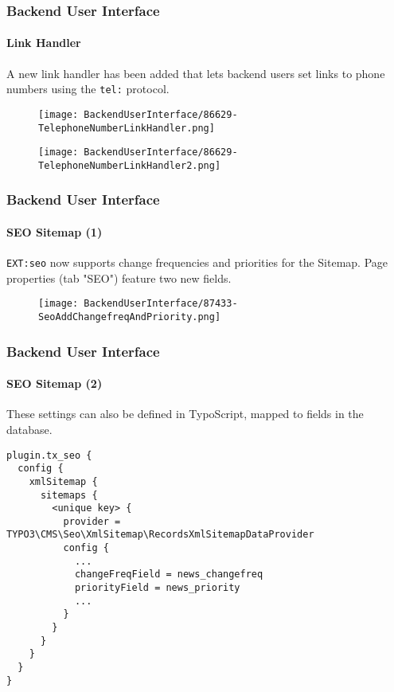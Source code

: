 
\begin{frame}[fragile]
	\frametitle{Backend User Interface}
	\framesubtitle{Link Handler}

	A new link handler has been added that lets backend users set links to phone
    numbers using the \texttt{tel:} protocol.

	\begin{figure}
		\texttt{[image: BackendUserInterface/86629-TelephoneNumberLinkHandler.png]}
	\end{figure}

	\begin{figure}
		\texttt{[image: BackendUserInterface/86629-TelephoneNumberLinkHandler2.png]}
	\end{figure}

\end{frame}


\begin{frame}[fragile]
	\frametitle{Backend User Interface}
	\framesubtitle{SEO Sitemap (1)}

	\texttt{EXT:seo} now supports change frequencies and priorities for the Sitemap.
	Page properties (tab "SEO") feature two new fields.

	\begin{figure}
		\texttt{[image: BackendUserInterface/87433-SeoAddChangefreqAndPriority.png]}
	\end{figure}

\end{frame}


\begin{frame}[fragile]
	\frametitle{Backend User Interface}
	\framesubtitle{SEO Sitemap (2)}

	\lstset{basicstyle=\tiny\ttfamily}

	These settings can also be defined in TypoScript, mapped to fields in the database.

	\begin{lstlisting}
plugin.tx_seo {
  config {
    xmlSitemap {
      sitemaps {
        <unique key> {
          provider = TYPO3\CMS\Seo\XmlSitemap\RecordsXmlSitemapDataProvider
          config {
            ...
            changeFreqField = news_changefreq
            priorityField = news_priority
            ...
          }
        }
      }
    }
  }
}
	\end{lstlisting}

\end{frame}

